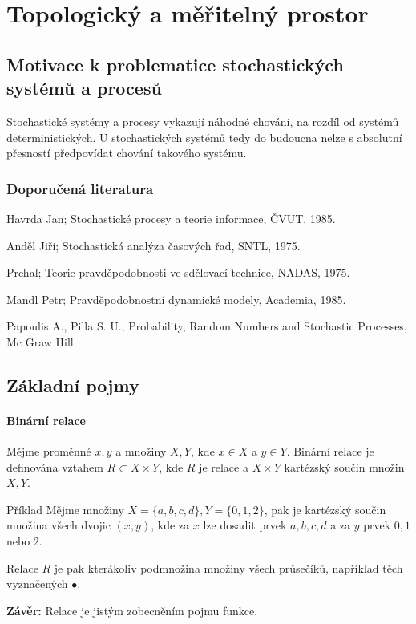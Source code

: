 	\chapter{Topologický a měřitelný prostor}
	\section{Motivace k problematice stochastických systémů a procesů}
	Stochastické systémy a procesy vykazují náhodné chování, na rozdíl od systémů deterministických. U stochastických systémů tedy do budoucna nelze s absolutní přesností předpovídat chování takového systému.
	
	\begin{figure}
		
	\end{figure}
	
	\subsection{Doporučená literatura}
	\begin{enumerate}[noitemsep, label={[\arabic*]}]
	\item Havrda Jan; Stochastické procesy a teorie informace, ČVUT, 1985.
	\item Anděl Jiří; Stochastická analýza časových řad, SNTL, 1975.
	\item Prchal; Teorie pravděpodobnosti ve sdělovací technice, NADAS, 1975.
	\item Mandl Petr; Pravděpodobnostní dynamické modely, Academia, 1985.
	\item Papoulis A., Pilla S. U., Probability, Random Numbers and Stochastic Processes, Mc Graw Hill.
	\end{enumerate}
	
	\section{Základní pojmy}
	\subsubsection{Binární relace}
	Mějme proměnné $x,y$ a množiny $X,Y$, kde $x\in X$ a $y\in Y$. Binární relace je definována vztahem $R\subset X\times Y$, kde $R$ je relace a $X\times Y$ kartézský součin množin $X,Y$.
	
	\begin{note}{Příklad}
	Mějme množiny $X=\{a,b,c,d\}, Y=\{0,1,2\}$, pak je kartézský součin množina všech dvojic $(x,y)$, kde za $x$ lze dosadit prvek $a,b,c,d$ a za $y$ prvek $0,1$ nebo $2$.\br
	
	Relace $R$ je pak kterákoliv podmnožina množiny všech průsečíků, například těch vyznačených $\bullet$.
	
	\begin{figure}
		
	\end{figure}		
	\textbf{Závěr: } Relace je jistým zobecněním pojmu funkce.
	\end{note}
	
